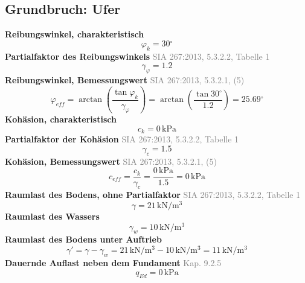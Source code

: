 \documentclass[11pt,a4paper]{article}
\newcommand{\normref}[1]{{\small\textcolor{gray}{#1}}}
\begin{document}
\subsection{Grundbruch: Ufer}
\noindent\textbf{Reibungswinkel, charakteristisch}
\begin{equation*}
\varphi_k = 30{}^{\circ}
\end{equation*}
\noindent\textbf{Partialfaktor des Reibungswinkels} \hfill \normref{SIA 267:2013, 5.3.2.2, Tabelle 1}
\begin{equation*}
\gamma_{\varphi} = 1.2
\end{equation*}
\noindent\textbf{Reibungswinkel, Bemessungswert} \hfill \normref{SIA 267:2013, 5.3.2.1, (5)}
\begin{equation*}
\varphi_{eff} = \arctan\left(\frac{\tan \varphi_k}{\gamma_{\varphi}}\right) = \arctan\left(\frac{\tan 30{}^{\circ}}{1.2}\right) = 25.69{}^{\circ}
\end{equation*}
\noindent\textbf{Kohäsion, charakteristisch}
\begin{equation*}
c_k = 0\,\mathrm{kPa}
\end{equation*}
\noindent\textbf{Partialfaktor der Kohäsion} \hfill \normref{SIA 267:2013, 5.3.2.2, Tabelle 1}
\begin{equation*}
\gamma_c = 1.5
\end{equation*}
\noindent\textbf{Kohäsion, Bemessungswert} \hfill \normref{SIA 267:2013, 5.3.2.1, (5)}
\begin{equation*}
c_{eff} = \frac{c_k}{\gamma_c} = \frac{0\,\mathrm{kPa}}{1.5} = 0\,\mathrm{kPa}
\end{equation*}
\noindent\textbf{Raumlast des Bodens, ohne Partialfaktor} \hfill \normref{SIA 267:2013, 5.3.2.2, Tabelle 1}
\begin{equation*}
\gamma = 21\,\mathrm{kN}/\mathrm{m}^{3}
\end{equation*}
\noindent\textbf{Raumlast des Wassers}
\begin{equation*}
\gamma_w = 10\,\mathrm{kN}/\mathrm{m}^{3}
\end{equation*}
\noindent\textbf{Raumlast des Bodens unter Auftrieb}
\begin{equation*}
\gamma' = \gamma - \gamma_w = 21\,\mathrm{kN}/\mathrm{m}^{3} - 10\,\mathrm{kN}/\mathrm{m}^{3} = 11\,\mathrm{kN}/\mathrm{m}^{3}
\end{equation*}
\noindent\textbf{Dauernde Auflast neben dem Fundament} \hfill \normref{Kap. 9.2.5}
\begin{equation*}
q_{Ed} = 0\,\mathrm{kPa}
\end{equation*}
\end{document}
